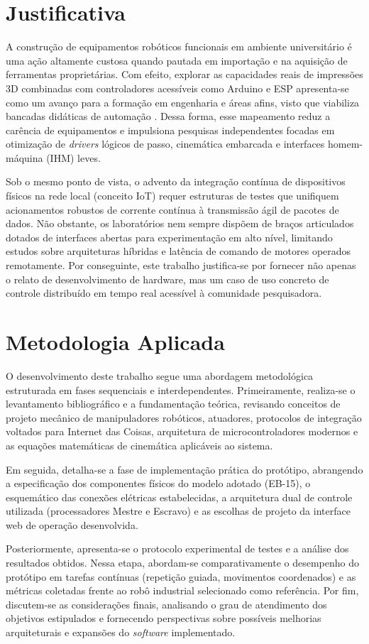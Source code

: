 \section{Justificativa}

A construção de equipamentos robóticos funcionais em ambiente universitário é uma ação altamente custosa quando pautada em importação e na aquisição de ferramentas proprietárias. Com efeito, explorar as capacidades reais de impressões 3D combinadas com controladores acessíveis como Arduino e ESP apresenta-se como um avanço para a formação em engenharia e áreas afins, visto que viabiliza bancadas didáticas de automação \cite{siciliano2009}. Dessa forma, esse mapeamento reduz a carência de equipamentos e impulsiona pesquisas independentes focadas em otimização de \textit{drivers} lógicos de passo, cinemática embarcada e interfaces homem-máquina (IHM) leves.

Sob o mesmo ponto de vista, o advento da integração contínua de dispositivos físicos na rede local (conceito IoT) requer estruturas de testes que unifiquem acionamentos robustos de corrente contínua à transmissão ágil de pacotes de dados. Não obstante, os laboratórios nem sempre dispõem de braços articulados dotados de interfaces abertas para experimentação em alto nível, limitando estudos sobre arquiteturas híbridas e latência de comando de motores operados remotamente. Por conseguinte, este trabalho justifica-se por fornecer não apenas o relato de desenvolvimento de hardware, mas um caso de uso concreto de controle distribuído em tempo real acessível à comunidade pesquisadora.

\section{Metodologia Aplicada}

O desenvolvimento deste trabalho segue uma abordagem metodológica estruturada em fases sequenciais e interdependentes. Primeiramente, realiza-se o levantamento bibliográfico e a fundamentação teórica, revisando conceitos de projeto mecânico de manipuladores robóticos, atuadores, protocolos de integração voltados para Internet das Coisas, arquitetura de microcontroladores modernos e as equações matemáticas de cinemática aplicáveis ao sistema.

Em seguida, detalha-se a fase de implementação prática do protótipo, abrangendo a especificação dos componentes físicos do modelo adotado (EB-15), o esquemático das conexões elétricas estabelecidas, a arquitetura dual de controle utilizada (processadores Mestre e Escravo) e as escolhas de projeto da interface web de operação desenvolvida.

Posteriormente, apresenta-se o protocolo experimental de testes e a análise dos resultados obtidos. Nessa etapa, abordam-se comparativamente o desempenho do protótipo em tarefas contínuas (repetição guiada, movimentos coordenados) e as métricas coletadas frente ao robô industrial selecionado como referência. Por fim, discutem-se as considerações finais, analisando o grau de atendimento dos objetivos estipulados e fornecendo perspectivas sobre possíveis melhorias arquiteturais e expansões do \textit{software} implementado.
